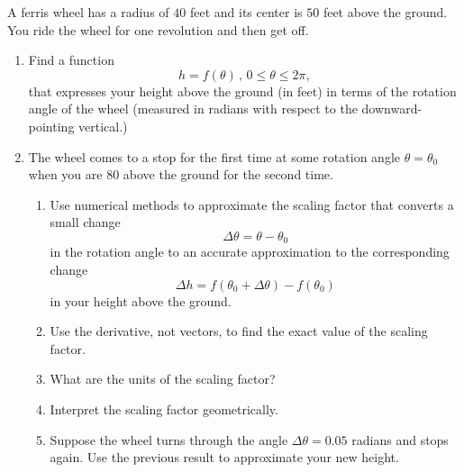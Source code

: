 \documentclass{ximera}
\begin{document}
\begin{exercise} \label{ExKmd331}
A ferris wheel has a radius of $40$ feet and its center is $50$ feet above the ground. You ride the wheel for one revolution and then get off.

\begin{enumerate}
\item Find a function
\[
    h = f(\theta) \, , \, 0 \leq \theta \leq 2\pi ,
\]
that expresses your height above the ground (in feet) in terms of the rotation angle of the wheel (measured in radians with respect to the downward-pointing vertical.)

\item The wheel comes to a stop for the first time at some rotation angle $\theta = \theta_0$ when you are $80$ above the ground for the second time.

\begin{enumerate}
\item Use numerical methods to approximate the scaling factor that converts a small change 
\[
 \Delta \theta = \theta - \theta_0
\]
in the rotation angle to an accurate approximation to the corresponding change
\[
  \Delta h = f(\theta_0 + \Delta \theta) - f(\theta_0)
\]
in your height above the ground.

\item Use the derivative, not vectors, to find the exact value of the scaling factor.

\item What are the units of the scaling factor?

\item Interpret the scaling factor geometrically.

\item Suppose the wheel turns through the angle $\Delta \theta = 0.05$ radians and stops again. Use the previous result to approximate your new height.

\end{enumerate}

\end{enumerate}

\end{exercise}
\end{document}
